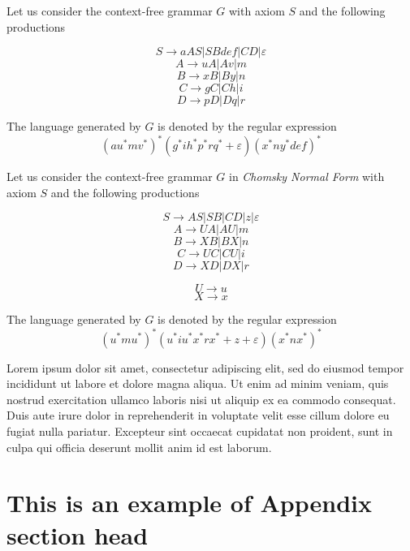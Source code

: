 \documentclass[prodmode,acmtecs]{acmsmall}
\begin{document}
\begin{example}
	Let us consider the context-free grammar $G$ with axiom $S$ and
	the following productions

	\[
	S\rightarrow aAS|SBdef|CD|\varepsilon
	\]
	\[
	A\rightarrow uA|Av|m
	\]
	\[
	B\rightarrow xB|By|n
	\]
	\[
	C\rightarrow gC|Ch|i
	\]
	\[
	D\rightarrow pD|Dq|r
	\]


	The language generated by $G$ is denoted by the regular expression
	\[
	(au^{*}mv^{*})^{*}(g^{*}ih^{*}p^{*}rq^{*}+\varepsilon)(x^{*}ny^{*}def)^{*}
	\]
\end{example}

\begin{example}
	Let us consider the context-free grammar $G$ in \textsl{Chomsky Normal
		Form} with axiom $S$ and the following productions

	\[
	S\rightarrow AS|SB|CD|z|\varepsilon
	\]
	\[
	A\rightarrow UA|AU|m
	\]
	\[
	B\rightarrow XB|BX|n
	\]
	\[
	C\rightarrow UC|CU|i
	\]
	\[
	D\rightarrow XD|DX|r
	\]


	\[
	U\rightarrow u
	\]
	\[
	X\rightarrow x
	\]

	The language generated by $G$ is denoted by the regular expression
	\[
	(u^{*}mu^{*})^{*}(u^{*}iu^{*}x^{*}rx^{*}+z+\varepsilon)(x^{*}nx^{*})^{*}
	\]
\end{example}


\begin{acks}
Lorem ipsum dolor sit amet, consectetur adipiscing elit, sed do eiusmod tempor incididunt ut labore et dolore magna aliqua.
Ut enim ad minim veniam, quis nostrud exercitation ullamco laboris nisi ut aliquip ex ea commodo consequat.
Duis aute irure dolor in reprehenderit in voluptate velit esse cillum dolore eu fugiat nulla pariatur.
Excepteur sint occaecat cupidatat non proident, sunt in culpa qui officia deserunt mollit anim id est laborum.
\end{acks}





\elecappendix

\medskip

\section{This is an example of Appendix section head}
\end{document}
